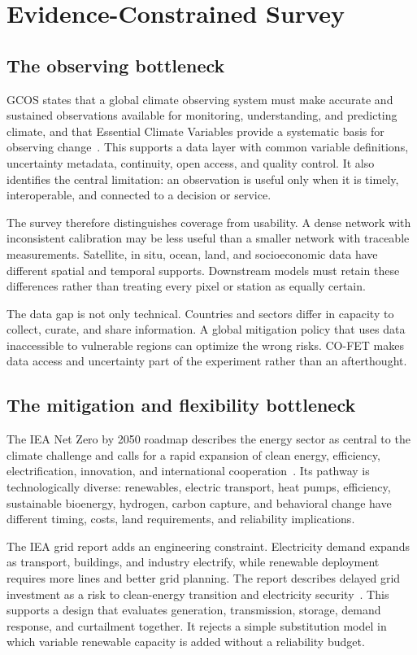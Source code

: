 \documentclass[conference]{IEEEtran}
\begin{document}
\section{Evidence-Constrained Survey}
\subsection{The observing bottleneck}
GCOS states that a global climate observing system must make accurate and sustained observations available for monitoring, understanding, and predicting climate, and that Essential Climate Variables provide a systematic basis for observing change~\cite{gcos}. This supports a data layer with common variable definitions, uncertainty metadata, continuity, open access, and quality control. It also identifies the central limitation: an observation is useful only when it is timely, interoperable, and connected to a decision or service.

The survey therefore distinguishes coverage from usability. A dense network with inconsistent calibration may be less useful than a smaller network with traceable measurements. Satellite, in situ, ocean, land, and socioeconomic data have different spatial and temporal supports. Downstream models must retain these differences rather than treating every pixel or station as equally certain.

The data gap is not only technical. Countries and sectors differ in capacity to collect, curate, and share information. A global mitigation policy that uses data inaccessible to vulnerable regions can optimize the wrong risks. CO-FET makes data access and uncertainty part of the experiment rather than an afterthought.

\subsection{The mitigation and flexibility bottleneck}
The IEA Net Zero by 2050 roadmap describes the energy sector as central to the climate challenge and calls for a rapid expansion of clean energy, efficiency, electrification, innovation, and international cooperation~\cite{iea2021}. Its pathway is technologically diverse: renewables, electric transport, heat pumps, efficiency, sustainable bioenergy, hydrogen, carbon capture, and behavioral change have different timing, costs, land requirements, and reliability implications.

The IEA grid report adds an engineering constraint. Electricity demand expands as transport, buildings, and industry electrify, while renewable deployment requires more lines and better grid planning. The report describes delayed grid investment as a risk to clean-energy transition and electricity security~\cite{ieagrid}. This supports a design that evaluates generation, transmission, storage, demand response, and curtailment together. It rejects a simple substitution model in which variable renewable capacity is added without a reliability budget.
\end{document}
